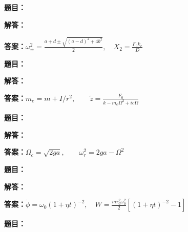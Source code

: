 \documentclass[lang=cn,color=blue,11pt]{elegantbook}
\begin{document}
\noindent\textbf{题目：}
\par\noindent\textbf{解答：}
\par\noindent\textbf{答案：}\(\displaystyle \omega_\pm^2=\frac{a+d\pm\sqrt{(a-d)^2+4b^2}}2,\quad X_2=\frac{F_0k_c}{D}\)\par
\par\smallskip\noindent\hrulefill\par\medskip
{}\par
\noindent\textbf{题目：}
\par\noindent\textbf{解答：}
\par\noindent\textbf{答案：}\(\displaystyle m_e=m+I/r^2,\qquad \tilde z=\frac{F_0}{k-m_e\Omega^2+ic\Omega}\)\par
\par\smallskip\noindent\hrulefill\par\medskip
{}\par
\noindent\textbf{题目：}
\par\noindent\textbf{解答：}
\par\noindent\textbf{答案：}\(\displaystyle \Omega_c=\sqrt{2ga},\qquad \omega_r^2=2ga-\Omega^2\)\par
\par\smallskip\noindent\hrulefill\par\medskip
{}\par
\noindent\textbf{题目：}
\par\noindent\textbf{解答：}
\par\noindent\textbf{答案：}\(\displaystyle \dot\phi=\omega_0(1+\eta t)^{-2},\quad W=\frac{mr_0^2\omega_0^2}{2}[(1+\eta t)^{-2}-1]\)\par
\par\smallskip\noindent\hrulefill\par\medskip
{}\par
\noindent\textbf{题目：}
\end{document}
